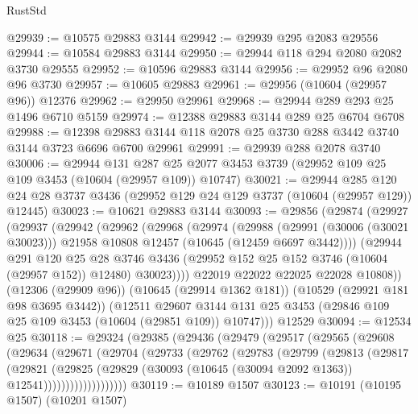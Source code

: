 \begin{lexlean}{RustStd}
\begin{coremodule}
@29939 := @10575 @29883 @3144
@29942 := @29939 @295 @2083 @29556
@29944 := @10584 @29883 @3144
@29950 := @29944 @118 @294 @2080 @2082 @3730 @29555
@29952 := @10596 @29883 @3144
@29956 := @29952 @96 @2080 @96 @3730
@29957 := @10605 @29883
@29961 := @29956 (@10604 (@29957 @96)) @12376
@29962 := @29950 @29961
@29968 := @29944 @289 @293 @25 @1496 @6710 @5159
@29974 := @12388 @29883 @3144 @289 @25 @6704 @6708
@29988 := @12398 @29883 @3144 @118 @2078 @25 @3730 @288 @3442 @3740 @3144 @3723 @6696 @6700 @29961
@29991 := @29939 @288 @2078 @3740
@30006 := @29944
    @131
    @287
    @25
    @2077
    @3453
    @3739
    (@29952 @109 @25 @109 @3453 (@10604 (@29957 @109)) @10747)
@30021 := @29944
    @285
    @120
    @24
    @28
    @3737
    @3436
    (@29952 @129 @24 @129 @3737 (@10604 (@29957 @129)) @12445)
@30023 := @10621 @29883 @3144
@30093 := @29856
    (@29874
      (@29927
        (@29937
          (@29942
            (@29962
              (@29968
                (@29974
                  (@29988
                    (@29991 (@30006 (@30021 @30023)))
                    @21958
                    @10808
                    @12457
                    (@10645 (@12459 @6697 @3442))))
                (@29944
                  @291
                  @120
                  @25
                  @28
                  @3746
                  @3436
                  (@29952 @152 @25 @152 @3746 (@10604 (@29957 @152)) @12480)
                  @30023))))
          @22019
          @22022
          @22025
          @22028
          @10808))
      (@12306 (@29909 @96))
      (@10645 (@29914 @1362 @181))
      (@10529 (@29921 @181 @98 @3695 @3442))
      (@12511
        @29607
        @3144
        @131
        @25
        @3453
        (@29846 @109 @25 @109 @3453 (@10604 (@29851 @109)) @10747)))
    @12529
@30094 := @12534 @25
@30118 := @29324
    (@29385
      (@29436
        (@29479
          (@29517
            (@29565
              (@29608
                (@29634
                  (@29671
                    (@29704
                      (@29733
                        (@29762
                          (@29783
                            (@29799
                              (@29813
                                (@29817
                                  (@29821
                                    (@29825
                                      (@29829
                                        (@30093
                                          (@10645 (@30094 @2092 @1363))
                                          @12541)))))))))))))))))))
@30119 := @10189 @1507
@30123 := @10191 (@10195 @1507) (@10201 @1507)

\end{coremodule}
\end{lexlean}
